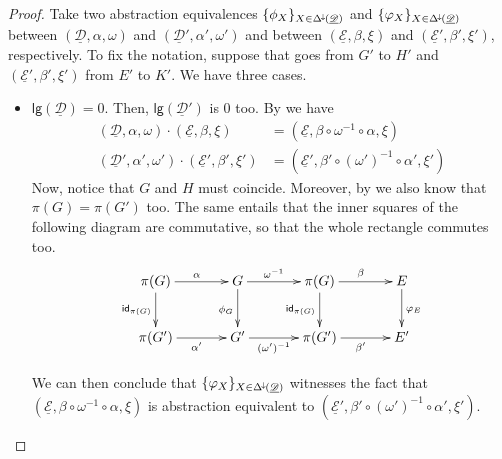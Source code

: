 \documentclass[a4paper]{article}
\newcommand{\Deltamin}{\Delta^{\hspace{-1pt}\downarrow\hspace{-1pt}}}
\newcommand{\id}[1]{\mathsf{id}_{#1}}
\newcommand{\dder}[1]{\mathscr{#1}}
\newcommand{\der}[1]{\underline{\dder{#1}}}
\newcommand{\lgh}[0]{\mathsf{lg}}
\theoremstyle{definition}
\begin{document}
\begin{proof} Take two abstraction equivalences $\{\phi_X\}_{X\in \Deltamin(\der{D})}$ and $\{\varphi_X\}_{X\in \Deltamin(\der{D})}$ between $(\der{D}, \alpha, \omega)$ and $(\der{D}', \alpha', \omega')$ and between $(\der{E}, \beta, \xi)$ and $(\der{E}', \beta', \xi')$, respectively. To fix the notation, suppose that goes from $G'$ to $H'$ and $(\der{E}', \beta', \xi')$ from $E'$ to $K'$. We have three cases.
	
\begin{itemize}
	\item $\lgh(\der{D})=0$. Then, $\lgh(\der{D}')$ is $0$ too. By  we have
	\begin{align*}
	(\der{D}, \alpha, \omega)\cdot (\der{E}, \beta, \xi)&=(\der{E}, \beta\circ \omega^{-1}\circ \alpha, \xi)\\
		(\der{D}', \alpha', \omega')\cdot (\der{E}', \beta', \xi')&=(\der{E}', \beta'\circ (\omega')^{-1}\circ \alpha', \xi')
	\end{align*}
 Now, notice that $G$ and $H$ must coincide. Moreover, by  we also know that $\pi(G)=\pi(G')$ too. The same  entails that the inner squares of the following diagram are commutative, so that the whole rectangle commutes too.
 \[\xymatrix@C=35pt{\pi(G) \ar[r]^{\alpha} \ar[d]_{\id{\pi(G)}}& G  \ar[d]_{\phi_G}\ar[r]^-{\omega^{-1}} & \pi(G) \ar[d]_{\id{\pi(G)}} \ar[r]^{\beta}& E \ar[d]^{\varphi_E}\\\pi(G') \ar[r]_{\alpha'}& G' \ar[r]_-{(\omega')^{-1}} & \pi(G') \ar[r]_{\beta'} & E'}\]
 
 We can  then conclude that $\{\varphi_X\}_{X\in \Deltamin(\der{D})}$ witnesses the fact that $(\der{E}, \beta\circ \omega^{-1}\circ \alpha, \xi)$ is abstraction equivalent to $(\der{E}', \beta'\circ (\omega')^{-1}\circ \alpha', \xi')$.


\end{itemize}
\end{proof}
\end{document}
